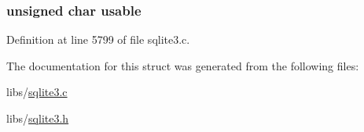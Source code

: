 \subsubsection[{usable}]{\setlength{\rightskip}{0pt plus 5cm}unsigned char usable}\label{structsqlite3__index__info_1_1sqlite3__index__constraint_a2cd12922598daeddd0423ba5584d2963}


Definition at line 5799 of file sqlite3.\+c.



The documentation for this struct was generated from the following files\+:\begin{DoxyCompactItemize}
\item 
libs/\hyperlink{sqlite3_8c}{sqlite3.\+c}\item 
libs/\hyperlink{sqlite3_8h}{sqlite3.\+h}\end{DoxyCompactItemize}
